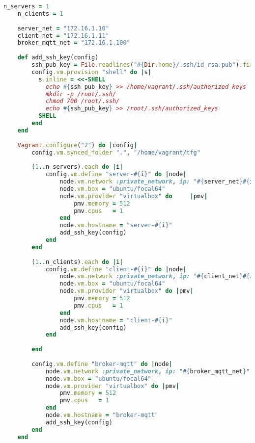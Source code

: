 \begin{lstlisting}[language=Ruby, caption={Archivo de configuración Vagrantfile}, label={code:vagrantfile}]
    n_servers = 1
    n_clients = 1
    
    server_net = "172.16.1.10"
    client_net = "172.16.1.11"
    broker_mqtt_net = "172.16.1.100"
    
    def add_ssh_key(config)
        ssh_pub_key = File.readlines("#{Dir.home}/.ssh/id_rsa.pub").first.strip
        config.vm.provision "shell" do |s|
          s.inline = <<-SHELL
            echo #{ssh_pub_key} >> /home/vagrant/.ssh/authorized_keys
            mkdir -p /root/.ssh/
            chmod 700 /root/.ssh/
            echo #{ssh_pub_key} >> /root/.ssh/authorized_keys
          SHELL
        end
    end
    
    Vagrant.configure("2") do |config|
        config.vm.synced_folder ".", "/home/vagrant/tfg"
    
        (1..n_servers).each do |i|
            config.vm.define "server-#{i}" do |node|
                node.vm.network :private_network, ip: "#{server_net}#{i}"
                node.vm.box = "ubuntu/focal64"
                node.vm.provider "virtualbox" do     |pmv|
                    pmv.memory = 512
                    pmv.cpus   = 1
                end
                node.vm.hostname = "server-#{i}"
                add_ssh_key(config)
            end
        end
    
        (1..n_clients).each do |i|
            config.vm.define "client-#{i}" do |node|
                node.vm.network :private_network, ip: "#{client_net}#{i}"
                node.vm.box = "ubuntu/focal64"
                node.vm.provider "virtualbox" do |pmv|
                    pmv.memory = 512
                    pmv.cpus   = 1
                end
                node.vm.hostname = "client-#{i}"
                add_ssh_key(config)
            end
            
        end
    
        config.vm.define "broker-mqtt" do |node|
            node.vm.network :private_network, ip: "#{broker_mqtt_net}"
            node.vm.box = "ubuntu/focal64"
            node.vm.provider "virtualbox" do |pmv|
                pmv.memory = 512
                pmv.cpus   = 1
            end
            node.vm.hostname = "broker-mqtt"
            add_ssh_key(config)
        end
    end        
\end{lstlisting}
